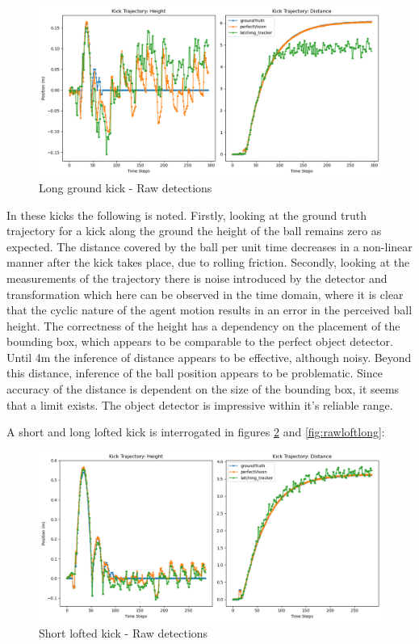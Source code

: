 \documentclass[a4paper,twoside,12pt]{report}
\begin{document}
\begin{figure}[h!]
\begin{center}
\includegraphics[width=14cm]{images/raw_ground_long.png}
\caption{Long ground kick - Raw detections}
\label{fig:rawgroundlong}
\end{center}
\end{figure}

In these kicks the following is noted. Firstly, looking at the ground truth trajectory for a kick along the ground the height of the ball remains zero as expected. The distance covered by the ball per unit time decreases in a non-linear manner after the kick takes place, due to rolling friction. Secondly, looking at the measurements of the trajectory there is noise introduced by the detector and transformation which here can be observed in the time domain, where it is clear that the cyclic nature of the agent motion results in an error in the perceived ball height. The correctness of the height has a dependency on the placement of the bounding box, which appears to be comparable to the perfect object detector. Until 4m the inference of distance appears to be effective, although noisy. Beyond this distance, inference of the ball position appears to be problematic. Since accuracy of the distance is dependent on the size of the bounding box, it seems that a limit exists. The object detector is impressive within it's reliable range.

A short and long lofted kick is interrogated in figures \ref{fig:rawloftshort} and \ref{fig:rawloftlong}:

\begin{figure}[h!]
\begin{center}
\includegraphics[width=14cm]{images/raw_loft_short.png}
\caption{Short lofted kick - Raw detections}
\label{fig:rawloftshort}
\end{center}
\end{figure}
\end{document}
